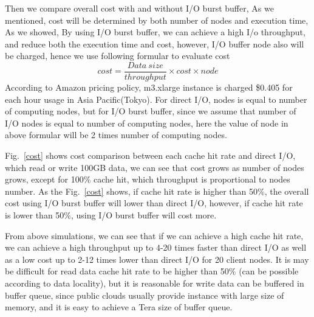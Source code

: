 
Then we compare overall cost with and without I/O burst buffer, As we mentioned, cost will be determined by both number of nodes and execution time, 
As we showed, By using I/O burst buffer, we can achieve a high I/o throughput, and reduce both the execution time and cost, however, I/O buffer node also will be charged, hence we use following formular to evaluate cost
\[cost=\frac{Data~size}{throughput}\times cost\times node\]
According to Amazon pricing policy, m3.xlarge instance is charged \$0.405 for each hour usage in Asia Pacific(Tokyo).
For direct I/O, nodes is equal to number of computing nodes, but for I/O burst buffer, since we assume that number of I/O nodes is equal to number of computing nodes, here the value of node in above formular will be 2 times number of computing nodes.

Fig.~\ref{cost} shows cost comparison between each cache hit rate and direct I/O, which read or write 100GB data, we can see that cost grows as number of nodes grows, except for 100\% cache hit, which throughput is proportional to nodes number.
As the Fig.~\ref{cost} shows, if cache hit rate is higher than 50\%, the overall cost using I/O burst buffer will lower than direct I/O, however, if cache hit rate is lower than 50\%, using I/O burst buffer will cost more.

From above simulations, we can see that if we can achieve a high cache hit rate, we can achieve a high throughput up to 4-20 times faster than direct I/O as well as a low cost up to 2-12 times lower than direct I/O for 20 client nodes.
It is may be difficult for read data cache hit rate to be higher than 50\% (can be possible according to data locality), but it is reasonable for write data can be buffered in buffer queue, since public clouds usually provide instance with large size of memory, and it is easy to achieve a Tera size of buffer queue.
